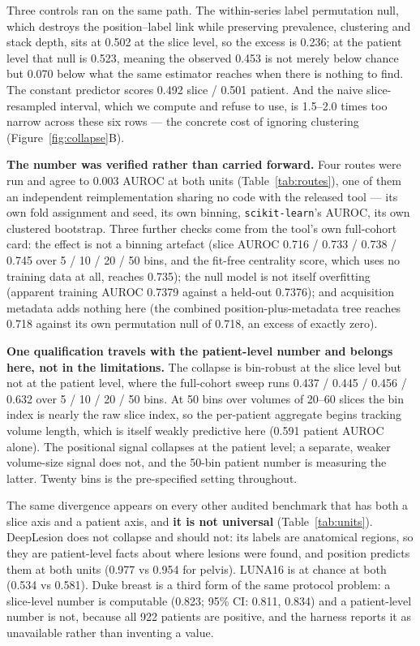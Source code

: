 \documentclass[11pt,a4paper]{article}
\begin{document}
Three controls ran on the same path. The within-series label permutation null,
which destroys the position--label link while preserving prevalence, clustering
and stack depth, sits at 0.502 at the slice level, so the excess is 0.236; at the
patient level that null is 0.523, meaning the observed 0.453 is not merely below
chance but 0.070 below what the same estimator reaches when there is nothing to
find. The constant predictor scores 0.492 slice / 0.501 patient. And the naive
slice-resampled interval, which we compute and refuse to use, is 1.5--2.0 times
too narrow across these six rows --- the concrete cost of ignoring clustering
(Figure~\ref{fig:collapse}B).

\textbf{The number was verified rather than carried forward.} Four routes were
run and agree to 0.003 AUROC at both units (Table~\ref{tab:routes}), one of them
an independent reimplementation sharing no code with the released tool --- its
own fold assignment and seed, its own binning, \texttt{scikit-learn}'s AUROC, its
own clustered bootstrap. Three further checks come from the tool's own
full-cohort card: the effect is not a binning artefact (slice AUROC 0.716 /
0.733 / 0.738 / 0.745 over 5 / 10 / 20 / 50 bins, and the fit-free centrality
score, which uses no training data at all, reaches 0.735); the null model is not
itself overfitting (apparent training AUROC 0.7379 against a held-out 0.7376);
and acquisition metadata adds nothing here (the combined position-plus-metadata
tree reaches 0.718 against its own permutation null of 0.718, an excess of
exactly zero).

\textbf{One qualification travels with the patient-level number and belongs
here, not in the limitations.} The collapse is bin-robust at the slice level but
not at the patient level, where the full-cohort sweep runs 0.437 / 0.445 / 0.456
/ 0.632 over 5 / 10 / 20 / 50 bins. At 50 bins over volumes of 20--60 slices the
bin index is nearly the raw slice index, so the per-patient aggregate begins
tracking volume length, which is itself weakly predictive here (0.591 patient
AUROC alone). The positional signal collapses at the patient level; a separate,
weaker volume-size signal does not, and the 50-bin patient number is measuring
the latter. Twenty bins is the pre-specified setting throughout.

The same divergence appears on every other audited benchmark that has both a
slice axis and a patient axis, and \textbf{it is not universal}
(Table~\ref{tab:units}). DeepLesion does not collapse and should not: its labels
are anatomical regions, so they are patient-level facts about where lesions were
found, and position predicts them at both units (0.977 vs 0.954 for pelvis).
LUNA16 is at chance at both (0.534 vs 0.581). Duke breast is a third form of the
same protocol problem: a slice-level number is computable (0.823; 95\% CI: 0.811,
0.834) and a patient-level number is not, because all 922 patients are positive,
and the harness reports it as unavailable rather than inventing a value.
\end{document}
